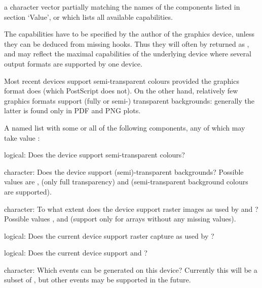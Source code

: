 %
\begin{Arguments}
\begin{ldescription}
\item[\code{what}] a character vector partially matching the names of the
components listed in section `Value', or  which
lists all available capabilities.
\end{ldescription}
\end{Arguments}
%
\begin{Details}\relax
The capabilities have to be specified by the author of the graphics
device, unless they can be deduced from missing hooks.  Thus they will
often by returned as , and may reflect the maximal
capabilities of the underlying device where several output formats are
supported by one device.

Most recent devices support semi-transparent colours provided the
graphics format does (which PostScript does not).  On the other hand,
relatively few graphics formats support (fully or semi-) transparent
backgrounds: generally the latter is found only in PDF and PNG plots.
\end{Details}
%
\begin{Value}
A named list with some or all of the following components, any of which may
take value :
\begin{ldescription}
\item[\code{semiTransparency}] logical:  Does the device support
semi-transparent colours?
\item[\code{transparentBackground}] character:  Does the device support
(semi)-transparent backgrounds?  Possible values are ,
 (only full transparency) and 
(semi-transparent background colours are supported).
\item[\code{rasterImage}] character: To what extent does the device support
raster images as used by  and
?  Possible values ,  and
 (support only for arrays without any missing
values). 
\item[\code{capture}] logical:  Does the current device
support raster capture as used by ?
\item[\code{locator}] logical:  Does the current device
support  and ?
\item[\code{events}] character:  Which events can be generated on this device?
Currently this will be a subset of , but other events may be
supported in the future.  
\end{ldescription}
\end{Value}
